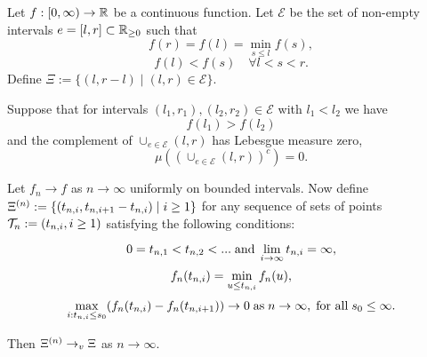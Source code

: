\begin{lemma} \label{L: Deterministic Lemma}
	Let $f:[0, \infty) \rightarrow \mathbb{R}$ be a continuous function. 
	Let $\mathcal{E}$ be the set of non-empty intervals 
	$e=[l,r] \subset \mathbb{R}_{\geq 0}$
	such that
	\begin{equation} \label{E: f cond 1}
	f(r) = f(l) = \min_{s \leq l} f(s),
	\end{equation}
	\begin{equation} \label{E: f cond 2}
	f(l) < f(s) \quad \forall l < s < r.
	\end{equation}
	Define $\Xi := \lbrace (l, r-l) \; | \; (l, r) \in \mathcal{E} \rbrace$.
	
	Suppose that for intervals $(l_1, r_1), (l_2, r_2) \in \mathcal{E}$ with $l_1 < l_2$ we have 
	\begin{equation} \label{E: f cond f(l1) > f(l2)}
	f(l_1) > f(l_2)
	\end{equation}
	and the complement of $\cup_{e \in \mathcal{E}} (l,r)$ has Lebesgue measure zero,
	\begin{equation} \label{E: f cond complement zero}
	\mu \left( \left( \cup_{e \in \mathcal{E}} (l,r) \right)^c\right) = 0.
	\end{equation}
	
	Let $f_n \rightarrow f$ as $n \rightarrow \infty$ uniformly on bounded intervals.
	Now define $\Xi^{(n)} := \lbrace (t_{n, i}, t_{n, i+1} - t_{n, i}) \; | \; i \geq 1 \rbrace$
	for any sequence of sets of points $\mathcal{T}_n := (t_{n, i}, i \geq 1)$ satisfying the following conditions:
	
	\begin{equation} \label{E: fn cond 3}
	0 = t_{n, 1} < t_{n, 2} < ... \; \text{and} \; \lim_{i \rightarrow \infty} t_{n, i} = \infty,
	\end{equation}
	\begin{equation} \label{E: fn cond 4}
	f_n(t_{n, i}) = \min_{u \leq t_{n, i}}f_n(u), 
	\end{equation}
	\begin{equation} \label{E: fn cond 5}
	\max_{i: t_{n, i} \leq s_0}(f_n(t_{n, i}) - f_n(t_{n, i+1})) \rightarrow 0 \; \text{as} \; n \rightarrow \infty, \; \text{for all} \; s_0 \leq \infty.
	\end{equation}
	
	Then $\Xi^{(n)} \rightarrow_v \Xi$ as $n \rightarrow \infty$.
\end{lemma}

